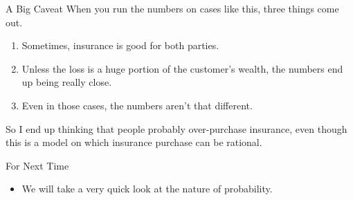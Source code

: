 \documentclass[
  ignorenonframetext,
]{beamer}
\providecommand{\tightlist}{%
  \setlength{\itemsep}{0pt}\setlength{\parskip}{0pt}}
\begin{document}
\begin{frame}{A Big Caveat}
\protect\hypertarget{a-big-caveat}{}
When you run the numbers on cases like this, three things come out.

\begin{enumerate}
\tightlist
\item
  Sometimes, insurance is good for both parties. \pause
\item
  Unless the loss is a huge portion of the customer's wealth, the
  numbers end up being really close. \pause
\item
  Even in those cases, the numbers aren't that different.
\end{enumerate}

So I end up thinking that people probably over-purchase insurance, even
though this is a model on which insurance purchase can be rational.
\end{frame}

\begin{frame}{For Next Time}
\protect\hypertarget{for-next-time}{}
\begin{itemize}
\tightlist
\item
  We will take a very quick look at the nature of probability.
\end{itemize}
\end{frame}
\end{document}
